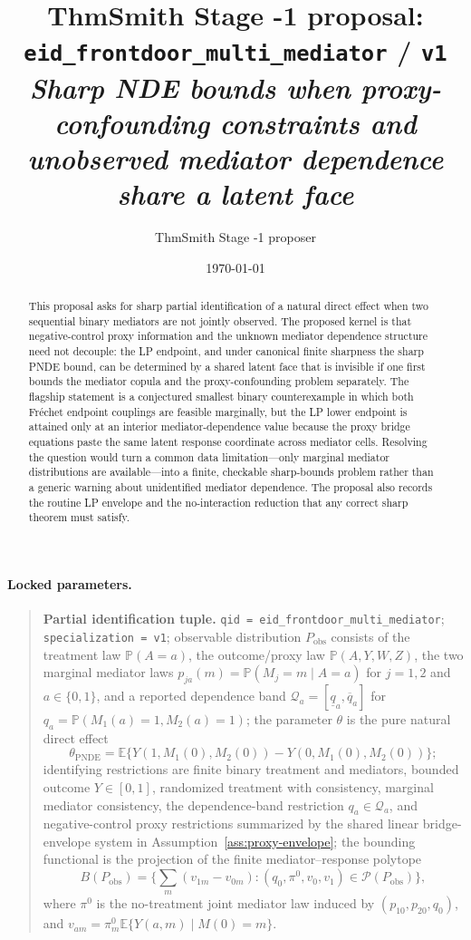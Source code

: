 \documentclass[11pt]{article}
\title{ThmSmith Stage -1 proposal: \texttt{eid\_frontdoor\_multi\_mediator} / \texttt{v1}%
  \\ \large\textit{Sharp NDE bounds when proxy-confounding constraints and unobserved mediator dependence share a latent face}}
\author{ThmSmith Stage -1 proposer}
\date{\today}
\newcommand{\E}{\mathbb{E}}
\renewcommand{\Pr}{\mathbb{P}}
\theoremstyle{definition}
\theoremstyle{plain}
\theoremstyle{remark}
\begin{document}
\maketitle


\paragraph{Locked parameters.}
\begin{quote}
\textbf{Partial identification tuple.}
\texttt{qid = eid\_frontdoor\_multi\_mediator};
\texttt{specialization = v1};
observable distribution \(P_{\mathrm{obs}}\) consists of the treatment law
\(\Pr(A=a)\), the outcome/proxy law \(\Pr(A,Y,W,Z)\), the two marginal
mediator laws \(p_{ja}(m)=\Pr(M_j=m\mid A=a)\) for \(j=1,2\) and
\(a\in\{0,1\}\), and a reported dependence band
\(\mathcal Q_a=[\underline q_a,\overline q_a]\) for
\(q_a=\Pr(M_1(a)=1,M_2(a)=1)\);
the parameter \(\theta\) is the pure natural direct effect
\[
  \theta_{\mathrm{PNDE}}
  = \E\{Y(1,M_1(0),M_2(0))-Y(0,M_1(0),M_2(0))\};
\]
identifying restrictions are finite binary treatment and mediators, bounded
outcome \(Y\in[0,1]\), randomized treatment with consistency, marginal
mediator consistency, the dependence-band restriction \(q_a\in\mathcal Q_a\),
and negative-control proxy restrictions summarized by the shared linear
bridge-envelope system in Assumption~\ref{ass:proxy-envelope};
the bounding functional is the projection of the finite mediator--response
polytope
\[
  B(P_{\mathrm{obs}})
  = \{\sum_m(v_{1m}-v_{0m}) :
       (q_0,\pi^0,v_0,v_1)\in\mathcal P(P_{\mathrm{obs}})\},
\]
where \(\pi^0\) is the no-treatment joint mediator law induced by
\((p_{10},p_{20},q_0)\), and \(v_{am}=\pi^0_m\E\{Y(a,m)\mid M(0)=m\}\).
\end{quote}

\begin{abstract}
This proposal asks for sharp partial identification of a natural direct effect
when two sequential binary mediators are not jointly observed.  The proposed
kernel is that negative-control proxy information and the unknown mediator
dependence structure need not decouple: the LP endpoint, and under canonical
finite sharpness the sharp PNDE bound, can be determined by a shared latent
face that is invisible if one first bounds the mediator copula and the
proxy-confounding problem separately.  The flagship statement is
a conjectured smallest binary counterexample in which both Fréchet endpoint
couplings are feasible marginally, but the LP lower endpoint is attained only
at an interior mediator-dependence value because the proxy bridge equations
paste the same latent response coordinate across mediator cells.  Resolving the
question would turn a common data limitation---only marginal mediator
distributions are available---into a finite, checkable sharp-bounds problem
rather than a generic warning about unidentified mediator dependence.  The
proposal also records the routine LP envelope and the no-interaction reduction
that any correct sharp theorem must satisfy.
\end{abstract}
\end{document}

